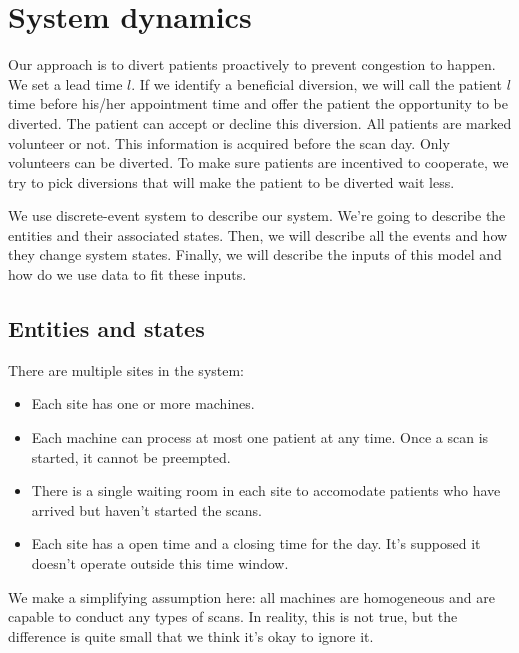 \section{System dynamics}

Our approach is to divert patients proactively to prevent
congestion to happen. We set a lead time $l$. If we identify
a beneficial diversion, we will call the patient $l$ time
before his/her appointment time and offer the patient
the opportunity to be diverted. The patient can accept or
decline this diversion. All patients are marked volunteer
or not. This information is acquired before the scan day.
Only volunteers can be diverted. To make sure patients
are incentived to cooperate, we try to pick diversions
that will make the patient to be diverted wait less.

We use discrete-event system to describe our system. We're going
to describe the entities and their associated states. Then, we
will describe all the events and how they change system states.
Finally, we will describe the inputs of this model and how do
we use data to fit these inputs.

\subsection{Entities and states}

There are multiple sites in the system:
\begin{itemize}
\item Each site has one or more machines.
\item Each machine can process at most one patient at any time.
Once a scan is started, it cannot be preempted.
\item There is a single waiting room in each site to accomodate
      patients who have arrived but haven't started the scans.
\item Each site has a open time and a closing time for the day.
      It's supposed it doesn't operate outside this time window.
\end{itemize}
We make a simplifying assumption here: all machines are homogeneous
and are capable to conduct any types of scans. In reality, this is not
true, but the difference is quite small that we think it's okay to
ignore it.

